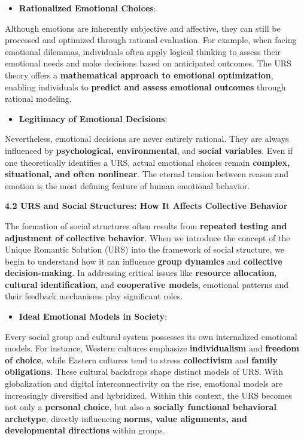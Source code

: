 \documentclass[
]{article}
\begin{document}
\begin{itemize}
\item
  \textbf{Rationalized Emotional Choices}:
\end{itemize}

Although emotions are inherently subjective and affective, they can
still be processed and optimized through rational evaluation. For
example, when facing emotional dilemmas, individuals often apply logical
thinking to assess their emotional needs and make decisions based on
anticipated outcomes. The URS theory offers a \textbf{mathematical
approach to emotional optimization}, enabling individuals to
\textbf{predict and assess emotional outcomes} through rational
modeling.

\begin{itemize}
\item
  \textbf{Legitimacy of Emotional Decisions}:
\end{itemize}

Nevertheless, emotional decisions are never entirely rational. They are
always influenced by \textbf{psychological, environmental}, and
\textbf{social variables}. Even if one theoretically identifies a URS,
actual emotional choices remain \textbf{complex, situational, and often
nonlinear}. The eternal tension between reason and emotion is the most
defining feature of human emotional behavior.

\textbf{4.2 URS and Social Structures: How It Affects Collective
Behavior}

The formation of social structures often results from \textbf{repeated
testing and adjustment of collective behavior}. When we introduce the
concept of the Unique Romantic Solution (URS) into the framework of
social structure, we begin to understand how it can influence
\textbf{group dynamics} and \textbf{collective decision-making}. In
addressing critical issues like \textbf{resource allocation},
\textbf{cultural identification}, and \textbf{cooperative models},
emotional patterns and their feedback mechanisms play significant roles.

\begin{itemize}
\item
  \textbf{Ideal Emotional Models in Society}:
\end{itemize}

Every social group and cultural system possesses its own internalized
emotional models. For instance, Western cultures emphasize
\textbf{individualism} and \textbf{freedom of choice}, while Eastern
cultures tend to stress \textbf{collectivism} and \textbf{family
obligations}. These cultural backdrops shape distinct models of URS.
With globalization and digital interconnectivity on the rise, emotional
models are increasingly diversified and hybridized. Within this context,
the URS becomes not only a \textbf{personal choice}, but also a
\textbf{socially functional behavioral archetype}, directly influencing
\textbf{norms, value alignments, and developmental directions} within
groups.
\end{document}

